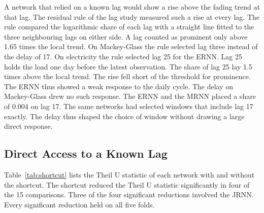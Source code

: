 \documentclass[conference,10pt]{IEEEtran}
\begin{document}
A network that relied on a known lag would show a rise above the fading
trend at that lag.
The residual rule of the lag study measured such a rise at every lag.
The rule compared the logarithmic share of each lag with a straight line
fitted to the three neighbouring lags on either side.
A lag counted as prominent only above 1.65 times the local trend.
On Mackey-Glass the rule selected lag three instead of the delay of 17.
On electricity the rule selected lag 25 for the ERNN.
Lag 25 holds the load one day before the latest observation.
The share of lag 25 lay 1.5 times above the local trend.
The rise fell short of the threshold for prominence.
The ERNN thus showed a weak response to the daily cycle.
The delay on Mackey-Glass drew no such response.
The ERNN and the MRNN placed a share of 0.004 on lag 17.
The same networks had selected windows that include lag 17 exactly.
The delay thus shaped the choice of window without drawing a large
direct response.

\subsection{Direct Access to a Known Lag}

Table~\ref{tab:shortcut} lists the Theil U statistic of each network
with and without the shortcut.
The shortcut reduced the Theil U statistic significantly in four of the
15 comparisons.
Three of the four significant reductions involved the JRNN.
Every significant reduction held on all five folds.
\end{document}
